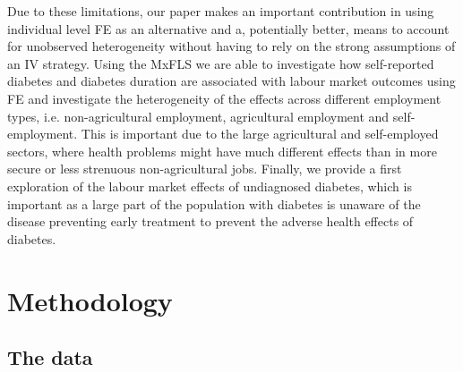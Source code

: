 \documentclass[12pt,english,british]{article}
\begin{document}
Due to these limitations, our paper makes an important contribution in using individual level \ac{FE} as an alternative and a, potentially better, means to account for unobserved heterogeneity without having to rely on the strong assumptions of an \ac{IV} strategy. Using the \ac{MxFLS} we are able to investigate
how self-reported diabetes and diabetes duration are associated with
labour market outcomes using \ac{FE} and investigate the heterogeneity
of the effects across different employment types, i.e.
non-agricultural employment, agricultural employment and self-employment.
This is important due to the large agricultural and self-employed
sectors, where health problems might have much different effects than
in more secure or less strenuous non-agricultural jobs. Finally, we provide a first exploration of the labour market effects
of undiagnosed diabetes, which is important as a large part of the
population with diabetes is unaware of the disease preventing early
treatment to prevent the adverse health effects of diabetes.





\section{\label{sec:Methodology}Methodology}


\subsection{\label{sec:Data}The data}
\end{document}
